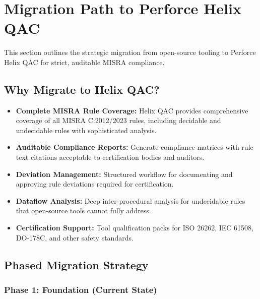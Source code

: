 \documentclass[11pt,letterpaper]{report}
\begin{document}
\chapter{Migration Path to Perforce Helix QAC}

This section outlines the strategic migration from open-source tooling to Perforce Helix QAC for strict, auditable MISRA compliance.

\section{Why Migrate to Helix QAC?}

\begin{itemize}[leftmargin=*]
    \item \textbf{Complete MISRA Rule Coverage:} Helix QAC provides comprehensive coverage of all MISRA C:2012/2023 rules, including decidable and undecidable rules with sophisticated analysis.

    \item \textbf{Auditable Compliance Reports:} Generate compliance matrices with rule text citations acceptable to certification bodies and auditors.

    \item \textbf{Deviation Management:} Structured workflow for documenting and approving rule deviations required for certification.

    \item \textbf{Dataflow Analysis:} Deep inter-procedural analysis for undecidable rules that open-source tools cannot fully address.

    \item \textbf{Certification Support:} Tool qualification packs for ISO 26262, IEC 61508, DO-178C, and other safety standards.
\end{itemize}

\section{Phased Migration Strategy}

\subsection{Phase 1: Foundation (Current State)}
\end{document}
